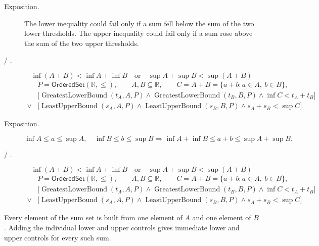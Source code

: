 \begin{remark*}
\begin{description}
  \item[Exposition.]
The lower inequality could fail only if a sum fell below the sum of the two lower thresholds. The upper inequality could fail only if a sum rose above the sum of the two upper thresholds.


  \item[ / .]
  \[
\inf(A+B)<\inf A+\inf B
\quad\text{or}\quad
\sup A+\sup B<\sup(A+B)
\]
\[
\begin{aligned}
&P=\mathsf{OrderedSet}(\mathbb{R},\leq),\qquad
A,B\subseteq\mathbb{R},\qquad C=A+B=\{a+b:a\in A,\ b\in B\},\\
&\bigl[\operatorname{GreatestLowerBound}(t_A,A,P)\land
\operatorname{GreatestLowerBound}(t_B,B,P)\land \inf C<t_A+t_B\bigr]\\
\lor
&\bigl[\operatorname{LeastUpperBound}(s_A,A,P)\land
\operatorname{LeastUpperBound}(s_B,B,P)\land s_A+s_B<\sup C\bigr]
\end{aligned}
\]
\end{description}
\end{remark*}

\begin{remark*}
\begin{description}
  \item[Exposition.]
\[
\inf A\le a\le \sup A,\quad \inf B\le b\le \sup B
\Longrightarrow
\inf A+\inf B\le a+b\le \sup A+\sup B.
\]


  \item[ / .]
  \[
\inf(A+B)<\inf A+\inf B
\quad\text{or}\quad
\sup A+\sup B<\sup(A+B)
\]
\[
\begin{aligned}
&P=\mathsf{OrderedSet}(\mathbb{R},\leq),\qquad
A,B\subseteq\mathbb{R},\qquad C=A+B=\{a+b:a\in A,\ b\in B\},\\
&\bigl[\operatorname{GreatestLowerBound}(t_A,A,P)\land
\operatorname{GreatestLowerBound}(t_B,B,P)\land \inf C<t_A+t_B\bigr]\\
\lor
&\bigl[\operatorname{LeastUpperBound}(s_A,A,P)\land
\operatorname{LeastUpperBound}(s_B,B,P)\land s_A+s_B<\sup C\bigr]
\end{aligned}
\]
\end{description}
\end{remark*}

\begin{remark*}[Interpretation]
Every element of the sum set is built from one element of $A$ and one element of $B$. Adding the individual lower and upper controls gives immediate lower and upper controls for every such sum.
\end{remark*}

